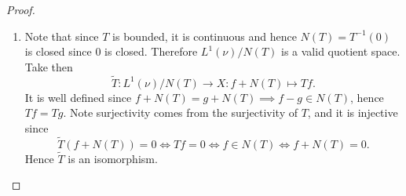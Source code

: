 \documentclass[hw_all.tex]{subfiles}
\begin{document}
\begin{proof}
\begin{enumerate}
        \item 
            Note that since $T$ is bounded, it is continuous and hence $N(T) = T^{-1}(\qty{0})$ is closed since $\qty{0}$ is closed. Therefore $L^1(\nu) / N(T)$ is a valid quotient space. Take then
            \[
                \tilde{T} : L^1(\nu) / N(T) \to X : f + N(T) \mapsto Tf
            .\]
            It is well defined since $f + N(T) = g + N(T) \implies f - g \in N(T)$, hence $Tf = Tg$. Note surjectivity comes from the surjectivity of $T$, and it is injective since
            \[
                \tilde{T}(f + N(T)) = 0 \Leftrightarrow Tf = 0 \Leftrightarrow f \in N(T) \Leftrightarrow f + N(T) = 0
            .\]
            Hence $\tilde{T}$ is an isomorphism.
    \end{enumerate}
\end{proof}
\end{document}
